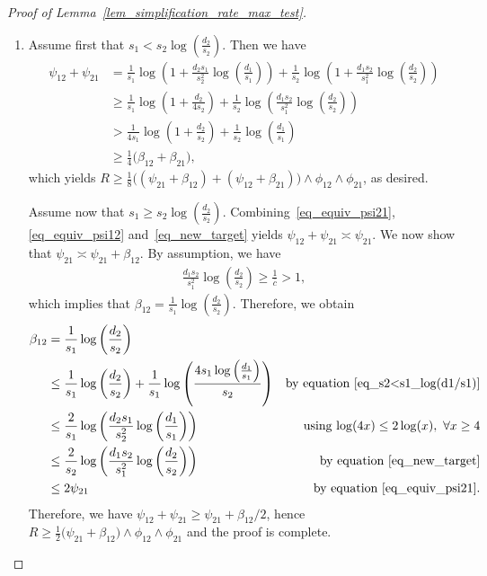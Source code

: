 \documentclass{article}
\theoremstyle{remark}
\begin{document}
\begin{proof}[Proof of Lemma~\ref{lem_simplification_rate_max_test}]
\begin{enumerate}
provided $a_1$ and $a_2$ are larger than suitably large constants, which can be enforced by choosing $c'$ small enough. 
This concludes the proof of the first claim.
\item Assume first that $s_1 < s_2 \log \left(\frac{d_2}{s_2}\right)$. 
Then we have 
    $$\begin{aligned}
    \psi_{12} + \psi_{21}
    & = \frac{1}{s_1} \log\left(1+ \frac{d_2s_1}{s_2^2} \log\left(\frac{d_1}{s_1}\right)\right) + \frac{1}{s_2} \log\left(1+ \frac{d_1s_2}{s_1^2} \log\left(\frac{d_2}{s_2}\right)\right)\\
    & \geq \frac{1}{s_1} \log\left( 1+ \frac{d_2}{4s_2} \right) + \frac{1}{s_2} \log\left(  \frac{d_1s_2}{s_1^2} \log\left(\frac{d_2}{s_2}\right)\right)\\
    & > \frac{1}{4s_1} \log\left( 1+ \frac{d_2}{s_2} \right) + \frac{1}{s_2} \log\left(\frac{d_1}{s_1}\right)\\
    & \geq \frac{1}{4} \big(\beta_{12} + \beta_{21}\big),
\end{aligned}
$$
which yields $R \geq \frac{1}{8} \big((\psi_{21} + \beta_{12}) + (\psi_{12}+\beta_{21})\big) \land \phi_{12} \land \phi_{21}$, as desired. 

Assume now that $s_1 \geq s_2 \log \left(\frac{d_2}{s_2}\right)$. 
Combining~\eqref{eq_equiv_psi21}, \eqref{eq_equiv_psi12} and~\eqref{eq_new_target} yields $\psi_{12} + \psi_{21} \asymp \psi_{21}$. 
We now show that $\psi_{21} \asymp \psi_{21} + \beta_{12}$. 
By assumption, we have
\begin{align*}
    \frac{d_1s_2}{s_1^2} \log\left(\frac{d_2}{s_2}\right)\geq \frac{1}{\bar c} >1,
\end{align*}
which implies that $\beta_{12} = \frac{1}{s_1} \log\left(\frac{d_2}{s_2}\right)$. 
Therefore, we obtain
\begin{align*}
        \beta_{12} & =\frac{1}{s_1} \log\left( \frac{d_2}{s_2} \right) & \\
        & \leq \frac{1}{s_1} \log\left( \frac{d_2}{s_2} \right) + \frac{1}{s_1} \log\left(\frac{4s_1\log\left(\frac{d_1}{s_1}\right)}{s_2}\right) & \text{by equation~\eqref{eq_s2<s1_log(d1/s1)}}\\
        &\leq \frac{2}{s_1} \log\left( \frac{d_2s_1}{s_2^2} \log\left(\frac{d_1}{s_1}\right)\right) & \text{ using $\log(4x) \leq 2 \log(x), ~\forall x\geq 4$}\\
        &\leq \frac{2}{s_2} \log\left( \frac{d_1s_2}{s_1^2} \log\left(\frac{d_2}{s_2}\right)\right) & \text{by equation~\eqref{eq_new_target}}\\
        & \leq 2 \psi_{21} & \text{ by equation~\eqref{eq_equiv_psi21}.}
    \end{align*}
    Therefore, we have $\psi_{12} + \psi_{21} \geq \psi_{21} + \beta_{12}/2$, hence $R \geq \frac{1}{2}\big(\psi_{21} + \beta_{12} \big) \land \phi_{12} \land \phi_{21}$ and the proof is complete.
\end{enumerate}
\end{proof}
\end{document}
